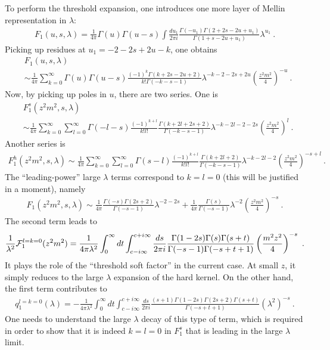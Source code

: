 \documentclass[a4paper,11pt]{article}
\begin{document}
To perform the threshold expansion,  one introduces one more layer of Mellin representation in $\lambda$:
\begin{align}
F_1(u,s,\lambda)=\frac{1}{4\pi}\Gamma(u)\Gamma(u-s) \int\frac{du_1}{2\pi i}\frac{\Gamma(-u_1)\Gamma(2+2s-2u+u_1)}{\Gamma(1+s-2u+u_1)}\lambda^{u_1} \ .
\end{align}
Picking up residues at $u_1=-2-2s+2u-k$, one obtains
\begin{align}
&F_1(u,s,\lambda)\nonumber \\ 
&\sim \frac{1}{4\pi}\sum_{k=0}^{\infty}\Gamma(u)\Gamma(u-s)\frac{(-1)^k \Gamma (k+2 s-2 u+2)}{k! \Gamma (-k-s-1) }\lambda^{-k-2-2s+2u}\left(\frac{z^2m^2}{4}\right)^{-u} \ .
\end{align}
Now, by picking up poles in $u$, there are two series. One is 
\begin{align}\label{eq:q1thresoft}
&F_1^{s}(z^2m^2,s,\lambda)\nonumber \\ 
&\sim \frac{1}{4\pi}\sum_{k=0}^{\infty}\sum_{l=0}^{\infty}\Gamma(-l-s)\frac{(-1)^{k+l}}{k!l!}\frac{\Gamma(k+2l+2s+2)}{\Gamma(-k-s-1)}\lambda^{-k-2l-2-2s}\left(\frac{z^2m^2}{4}\right)^l \ .
\end{align}
Another series is 
\begin{align}
F_1^{h}(z^2m^2,s,\lambda)\sim \frac{1}{4\pi}\sum_{k=0}^{\infty}\sum_{l=0}^{\infty}\Gamma(s-l)\frac{(-1)^{k+l}}{k!l!}\frac{\Gamma(k+2l+2)}{\Gamma(-k-s-1)}\lambda^{-k-2l-2}\left(\frac{z^2m^2}{4}\right)^{-s+l} \ .
\end{align}
The ``leading-power'' large $\lambda$ terms correspond to $k=l=0$ (this will be justified in a moment), namely 
\begin{align}
F_1(z^2m^2,s,\lambda)\sim \frac{1}{4\pi}\frac{\Gamma(-s)\Gamma(2s+2)}{\Gamma(-s-1)}\lambda^{-2-2s}+\frac{1}{4\pi}\frac{\Gamma(s)}{\Gamma(-s-1)}\lambda^{-2}\left(\frac{z^2m^2}{4}\right)^{-s} \ .
\end{align}
The second term leads to
\begin{align}
\frac{1}{\lambda^2}{\cal F}^{l=k=0}_1(z^2m^2)=\frac{1}{4\pi\lambda^2}\int_{0}^{\infty} dt \int_{c-i\infty}^{c+i\infty} \frac{ds}{2\pi i}\frac{\Gamma (1-2 s) \Gamma (s) \Gamma (s+t)}{\Gamma (-s-1) \Gamma (-s+t+1)}\left(\frac{m^2 z^2}{4}\right)^{-s} \ .
\end{align}
It plays the role of the ``threshold soft factor'' in the current case. At small $z$, it simply reduces to the large $\lambda$ expansion of the hard kernel. On the other hand, the first term contributes to 
\begin{align}
q_{1}^{l=k=0}(\lambda)=-\frac{1}{4\pi\lambda^2}\int_{0}^{\infty} dt \int_{c-i\infty}^{c+i\infty} \frac{ds}{2\pi i}\frac{(s+1)\Gamma (1-2 s)  \Gamma(2s+2)\Gamma (s+t)}{\Gamma (-s+t+1)}\left(\lambda^2\right)^{-s} \ .
\end{align}
One needs to understand the large $\lambda$ decay of this type of term, which is required in order to show that it is indeed $k=l=0$ in $F^{s}_1$ that is leading in the large $\lambda$ limit.
\end{document}
